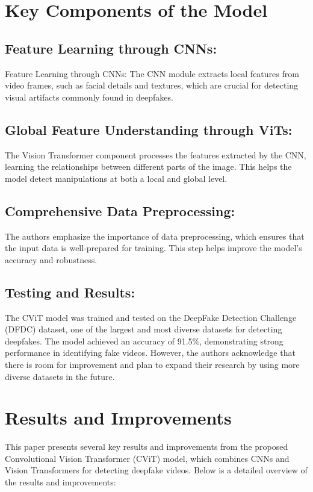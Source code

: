 \documentclass{report}
\begin{document}
	\section{Key Components of the Model}
	\subsection{Feature Learning through CNNs:}
	Feature Learning through CNNs: The CNN module extracts local features from video frames, such as facial details and textures, which are crucial for detecting visual artifacts commonly found in deepfakes.
	
	
	\subsection{Global Feature Understanding through ViTs:}
	The Vision Transformer component processes the features extracted by the CNN, learning the relationships between different parts of the image. This helps the model detect manipulations at both a local and global level.
	
	
	\subsection{Comprehensive Data Preprocessing:}
	The authors emphasize the importance of data preprocessing, which ensures that the input data is well-prepared for training. This step helps improve the model's accuracy and robustness.
	
	
	\subsection{Testing and Results:}
	 The CViT model was trained and tested on the DeepFake Detection Challenge (DFDC) dataset, one of the largest and most diverse datasets for detecting deepfakes. The model achieved an accuracy of 91.5\%, demonstrating strong performance in identifying fake videos. However, the authors acknowledge that there is room for improvement and plan to expand their research by using more diverse datasets in the future.
	
	
	
	
	\section{Results and Improvements}
	This paper presents several key results and improvements from the proposed Convolutional Vision Transformer (CViT) model, which combines CNNs and Vision Transformers for detecting deepfake videos. Below is a detailed overview of the results and improvements:
	
\end{document}
